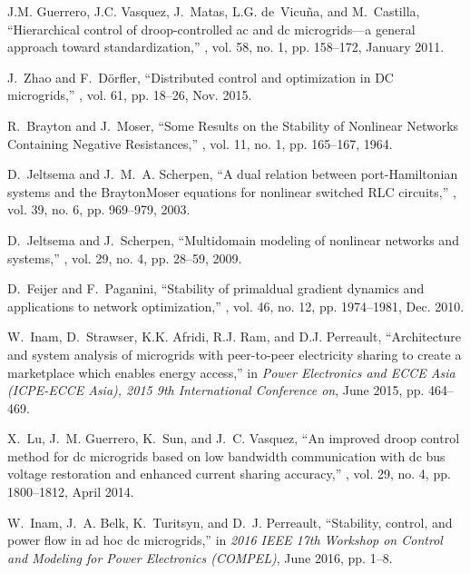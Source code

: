 \documentclass[letterpaper, 10 pt, conference]{ieeeconf}
\begin{document}
\begin{thebibliography}{10}
J.M. Guerrero, J.C. Vasquez, J.~Matas, L.G. de~Vicuña, and M.~Castilla,
\newblock ``Hierarchical control of droop-controlled ac and dc microgrids—a
  general approach toward standardization,''
, vol. 58, no. 1,
  pp. 158--172, January 2011.

J.~Zhao and F.~D{\"o}rfler,
\newblock ``{Distributed control and optimization in DC microgrids},''
, vol. 61, pp. 18--26, Nov. 2015.

R.~Brayton and J.~Moser,
\newblock ``{Some Results on the Stability of Nonlinear Networks Containing
  Negative Resistances},''
, vol. 11, no. 1, pp.
  165--167, 1964.

D.~Jeltsema and J.~M.~A. Scherpen,
\newblock ``{A dual relation between port-Hamiltonian systems and the
  Brayton{\textendash}Moser equations for nonlinear switched RLC circuits},''
, vol. 39, no. 6, pp. 969--979, 2003.

D.~Jeltsema and J.~Scherpen,
\newblock ``{Multidomain modeling of nonlinear networks and systems},''
, vol. 29, no. 4, pp. 28--59,
  2009.

D.~Feijer and F.~Paganini,
\newblock ``{Stability of primal{\textendash}dual gradient dynamics and
  applications to network optimization},''
, vol. 46, no. 12, pp. 1974--1981, Dec. 2010.

W.~Inam, D.~Strawser, K.K. Afridi, R.J. Ram, and D.J. Perreault,
\newblock ``Architecture and system analysis of microgrids with peer-to-peer
  electricity sharing to create a marketplace which enables energy access,''
\newblock in {\em Power Electronics and ECCE Asia (ICPE-ECCE Asia), 2015 9th
  International Conference on}, June 2015, pp. 464--469.

X.~Lu, J.~M. Guerrero, K.~Sun, and J.~C. Vasquez,
\newblock ``An improved droop control method for dc microgrids based on low
  bandwidth communication with dc bus voltage restoration and enhanced current
  sharing accuracy,''
, vol. 29, no. 4, pp.
  1800--1812, April 2014.

W.~Inam, J.~A. Belk, K.~Turitsyn, and D.~J. Perreault,
\newblock ``Stability, control, and power flow in ad hoc dc microgrids,''
\newblock in {\em 2016 IEEE 17th Workshop on Control and Modeling for Power
  Electronics (COMPEL)}, June 2016, pp. 1--8.


\end{thebibliography}
\end{document}
